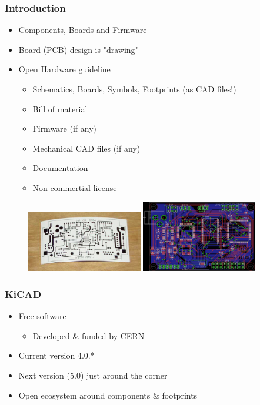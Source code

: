\documentclass{beamer}
\begin{document}
\begin{frame}
  \frametitle{Introduction}
  \begin{itemize}
    \item Components, Boards and Firmware
    \item Board (PCB) design is "drawing"
    \item Open Hardware guideline
      \begin{itemize}
        \item Schematics, Boards, Symbols, Footprints (as CAD files!)
        \item Bill of material
        \item Firmware (if any)
        \item Mechanical CAD files (if any)
        \item Documentation
        \item Non-commertial license
      \end{itemize}
  \end{itemize}

  \begin{figure}[H]
    \centering
    \includegraphics[width=0.45\textwidth]{images/pcb_on_paper.jpg}
    \includegraphics[width=0.45\textwidth]{images/pcb_in_kicad.jpg}
  \end{figure}
\end{frame}


\begin{frame}
  \frametitle{KiCAD}
  \begin{itemize}
    \item Free software
    \begin{itemize}
      \item Developed \& funded by CERN
    \end{itemize}
    \item Current version 4.0.*
    \item Next version (5.0) just around the corner
    \item Open ecosystem around components \& footprints
  \end{itemize}
\end{frame}
\end{document}
